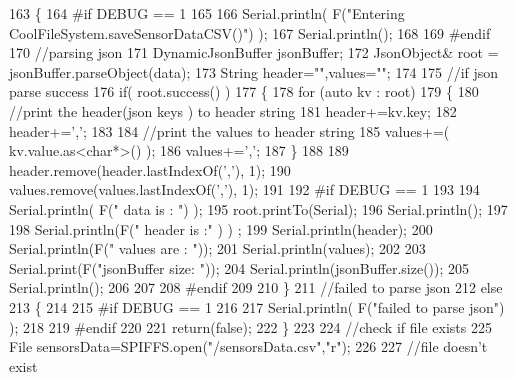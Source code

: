 \begin{DoxyCode}
163 \{
164 \textcolor{preprocessor}{#if DEBUG == 1}
165 
166     Serial.println( F(\textcolor{stringliteral}{"Entering CoolFileSystem.saveSensorDataCSV()"}) );
167     Serial.println();
168 
169 \textcolor{preprocessor}{#endif}
170     \textcolor{comment}{//parsing json}
171     DynamicJsonBuffer jsonBuffer;
172     JsonObject& root = jsonBuffer.parseObject(data);
173     String header=\textcolor{stringliteral}{""},values=\textcolor{stringliteral}{""};
174     
175     \textcolor{comment}{//if json parse success}
176     \textcolor{keywordflow}{if}( root.success() )
177     \{       
178         \textcolor{keywordflow}{for} (\textcolor{keyword}{auto} kv : root) 
179         \{
180             \textcolor{comment}{//print the header(json keys ) to header string}
181             header+=kv.key;
182             header+=\textcolor{charliteral}{','};
183             
184             \textcolor{comment}{//print the values to header string}
185             values+=( kv.value.as<\textcolor{keywordtype}{char}*>() );
186             values+=\textcolor{charliteral}{','};
187         \}
188 
189         header.remove(header.lastIndexOf(\textcolor{charliteral}{','}), 1);
190         values.remove(values.lastIndexOf(\textcolor{charliteral}{','}), 1);      
191     
192 \textcolor{preprocessor}{    #if DEBUG == 1}
193     
194         Serial.println( F(\textcolor{stringliteral}{" data is : "}) );
195         root.printTo(Serial);
196         Serial.println();
197         
198         Serial.println(F(\textcolor{stringliteral}{" header is :"} ) ) ;
199         Serial.println(header);
200         Serial.println(F(\textcolor{stringliteral}{" values are : "}));
201         Serial.println(values);
202         
203         Serial.print(F(\textcolor{stringliteral}{"jsonBuffer size: "}));
204         Serial.println(jsonBuffer.size());
205         Serial.println();
206 
207     
208 \textcolor{preprocessor}{    #endif}
209     
210     \}
211     \textcolor{comment}{//failed to parse json}
212     \textcolor{keywordflow}{else}
213     \{
214     
215 \textcolor{preprocessor}{    #if DEBUG == 1}
216 
217         Serial.println( F(\textcolor{stringliteral}{"failed to parse json"}) );
218     
219 \textcolor{preprocessor}{    #endif}
220 
221         \textcolor{keywordflow}{return}(\textcolor{keyword}{false});
222     \}
223 
224     \textcolor{comment}{//check if file exists}
225     File sensorsData=SPIFFS.open(\textcolor{stringliteral}{"/sensorsData.csv"},\textcolor{stringliteral}{"r"});
226     
227     \textcolor{comment}{//file doesn't exist}

\end{DoxyCode}
